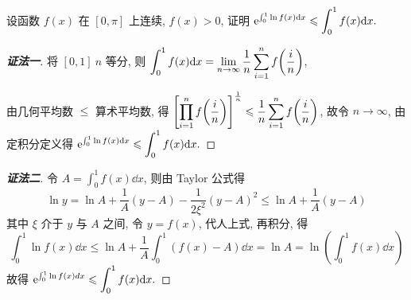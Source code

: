 \begin{example}
    设函数 $f(x)$ 在 $[0,\pi]$ 上连续, $f(x)>0$, 证明 $\displaystyle \mathrm{e} ^{\int_{0}^{1}\ln f(x)\dd x}\leqslant \int_{0}^{1}f(x)\dd x.$
\end{example}
\begin{proof}[{\songti \textbf{证法一}}]
    将 $[0,1]~n$ 等分, 则 $\displaystyle\int_{0}^{1}f(x)\dd x=\lim_{n\to\infty}\dfrac{1}{n}\sum_{i=1}^{n}f\qty(\dfrac{i}{n})$,
    由几何平均数 $\leqslant $ 算术平均数, 得 $\displaystyle \qty[\prod_{i=1}^{n}f\qty(\dfrac{i}{n})]^{\frac{1}{n}}\leqslant \dfrac{1}{n}\sum_{i=1}^{n}f\qty(\frac{i}{n})$,
    故令 $n\to\infty$, 由定积分定义得 $\displaystyle \mathrm{e} ^{\int_{0}^{1}\ln f(x)\dd x}\leqslant \int_{0}^{1}f(x)\dd x.$
\end{proof}
\begin{proof}[{\songti \textbf{证法二}}]
    令 $ \displaystyle A=\int_{0}^{1} f(x) \dd  x $, 则由 Taylor 公式得
    $$\ln y=\ln A+\frac{1}{A}(y-A)-\frac{1}{2 \xi^{2}}(y-A)^{2} \leqslant \ln A+\frac{1}{A}(y-A)$$
    其中 $ \xi $ 介于 $ y $ 与 $ A $ 之间, 令 $ y=f(x)$, 代人上式, 再积分, 得
    $$\int_{0}^{1} \ln f(x) \dd  x \leqslant \ln A+\frac{1}{A} \int_{0}^{1}(f(x)-A) \dd  x=\ln A=\ln \left(\int_{0}^{1} f(x) \dd  x\right)$$
    故得 $ \displaystyle \mathrm{e} ^{\int_{0}^{1} \ln f(x) d x} \leqslant \int_{0}^{1} f(x) \dd  x .$
\end{proof}

